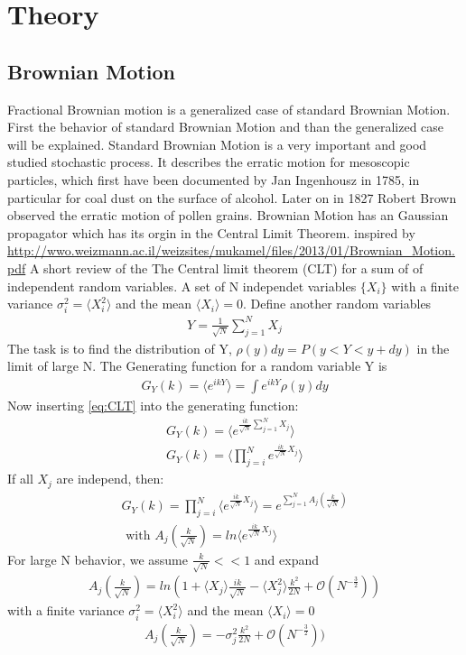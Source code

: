 \documentclass[
  a4paper,BCOR10mm,oneside,
  bibtotoc,idxtotoc,
  headsepline,footsepline,%
  fleqn,openbib
]{scrbook}
\begin{document}
\chapter{Theory}
\section{Brownian Motion}
Fractional Brownian motion is a generalized case of standard Brownian Motion. First the behavior of standard Brownian Motion and than the generalized case will be explained. \newline
Standard Brownian Motion is a very important and good studied stochastic process. It describes the erratic motion for mesoscopic particles, which  first have been documented by Jan Ingenhousz in 1785, in particular for coal dust on the surface of alcohol. Later on in 1827 Robert Brown observed the erratic motion of pollen grains.  Brownian Motion has an Gaussian propagator which has its orgin in the Central Limit Theorem.
inspired by \url{http://wwo.weizmann.ac.il/weizsites/mukamel/files/2013/01/Brownian_Motion.pdf} A short review of the The Central limit theorem (CLT) for a sum of of independent random variables. 
 A set of N independet variables $\{X_i\}$ with a finite variance $ \sigma_i^2=\langle X_{i}^2\rangle $ and the mean $\langle X_{i}\rangle = 0$. Define another random variables
 \begin{align}
  Y = \frac{1}{\sqrt{N}} \sum_{j=1}^N X_j \label{eq:CLT}
 \end{align}
The task is to find the distribution of Y, $\rho(y)dy=P(y<Y<y+dy)$ in the limit of large N. 
The Generating function for a random variable Y is 
\begin{align}
 G_Y(k)=\langle e^{ikY}\rangle = \int e^{ikY} \rho(y)dy
\end{align}
Now inserting \ref{eq:CLT} into the generating function:
\begin{align*}
G_Y(k)=\langle e^{\frac{ik}{\sqrt{N}} \sum_{j=1}^N X_j}\rangle \\
G_Y(k)=\langle \prod_{j=i}^N e^{\frac{ik}{\sqrt{N}} X_j} \rangle 
\end{align*}
If all $X_j$ are independ, then:
\begin{align}
 G_Y(k)= \prod_{j=i}^N \langle e^{\frac{ik}{\sqrt{N}} X_j} \rangle =e^{\sum_{j=1}^N A_j (\frac{k}{\sqrt{N}})} \\ \nonumber \text{ with } A_j(\frac{k}{\sqrt{N}})= ln \langle e^{\frac{ik}{\sqrt{N}} X_j} \rangle 
\end{align}
For large N behavior, we assume $\frac{k}{\sqrt{N}} << 1$ and expand
\begin{align}
 A_j(\frac{k}{\sqrt{N}}) = ln(1+ \langle X_j \rangle \frac{ik}{\sqrt{N}} - \langle X_{j}^2 \rangle \frac{k^2}{2N}+\mathcal{O}(N^{- \frac{3}{2}}))
\end{align}
 with a finite variance $ \sigma_i^2=\langle X_{i}^2\rangle $ and the mean $\langle X_{i}\rangle = 0$
\begin{align}
 A_j(\frac{k}{\sqrt{N}}) = -\sigma_j^2 \frac{k^2}{2N}+\mathcal{O}(N^{- \frac{3}{2}}))
\end{align}
\end{document}
